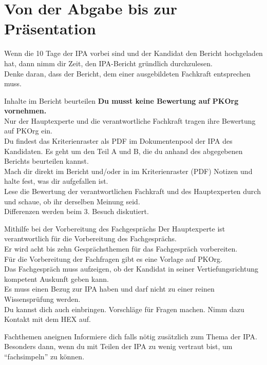 \section{Von der Abgabe bis zur Präsentation}
Wenn die 10 Tage der IPA vorbei sind und der Kandidat den Bericht hochgeladen hat, dann nimm dir Zeit, den IPA-Bericht gründlich durchzulesen.\\
Denke daran, dass der Bericht, dem einer ausgebildeten Fachkraft entsprechen muss.

\begin{taskitemwithoutcomment}{Inhalte im Bericht beurteilen}
  \textbf{Du musst keine Bewertung auf PKOrg vornehmen.}\\
  Nur der Hauptexperte und die verantwortliche Fachkraft tragen ihre Bewertung auf PKOrg ein.\\
  Du findest das Kriterienraster als PDF im Dokumentenpool der IPA des Kandidaten.
  Es geht um den Teil A und B, die du anhand des abgegebenen Berichts beurteilen kannst.\\
  Mach dir direkt im Bericht und/oder in im Kriterienraster (PDF) Notizen und halte fest, was dir aufgefallen ist.\\
  Lese die Bewertung der verantwortlichen Fachkraft und des Hauptexperten durch und schaue, ob ihr derselben Meinung seid.\\
  Differenzen werden beim 3. Besuch diskutiert.
\end{taskitemwithoutcomment}
\begin{taskitemwithoutcomment}{Mithilfe bei der Vorbereitung des Fachgesprächs}
  Der Hauptexperte ist verantwortlich für die Vorbereitung des Fachgesprächs.\\
  Er wird acht bis zehn Gesprächsthemen für das Fachgespräch vorbereiten.\\
  Für die Vorbereitung der Fachfragen gibt es eine Vorlage auf PKOrg.\\
  Das Fachgespräch muss aufzeigen, ob der Kandidat in seiner Vertiefungsrichtung kompetent Auskunft geben kann.\\
  Es muss einen Bezug zur IPA haben und darf nicht zu einer reinen Wissensprüfung werden.\\
  Du kannst dich auch einbringen. Vorschläge für Fragen machen. Nimm dazu Kontakt mit dem HEX auf.
\end{taskitemwithoutcomment}
\begin{taskitemwithoutcomment}{Fachthemen aneignen}
  Informiere dich falls nötig zusätzlich zum Thema der IPA. 
  Besonders dann, wenn du mit Teilen der IPA zu wenig vertraut bist, um \enquote{fachsimpeln} zu können.
\end{taskitemwithoutcomment}

